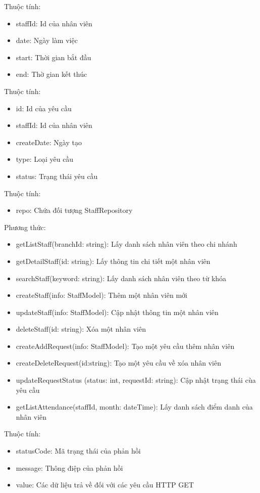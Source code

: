 Thuộc tính:
\begin{itemize}
	\item staffId: Id của nhân viên
	\item date: Ngày làm việc
	\item start: Thời gian bắt đầu
	\item end: Thờ gian kết thúc
\end{itemize}

Thuộc tính:
\begin{itemize}
	\item id: Id của yêu cầu
	\item staffId: Id của nhân viên
	\item createDate: Ngày tạo
	\item type: Loại yêu cầu
	\item status: Trạng thái yêu cầu
\end{itemize}

Thuộc tính:
\begin{itemize}
	\item repo: Chứa đối tượng StaffRepository
\end{itemize}
Phương thức:
\begin{itemize}
	\item getListStaff(branchId: string): Lấy danh sách nhân viên theo chi nhánh
	\item getDetailStaff(id: string): Lấy thông tin chi tiết một nhân viên
	\item searchStaff(keyword: string): Lấy danh sách nhân viên theo từ khóa
	\item createStaff(info: StaffModel): Thêm một nhân viên mới
	\item updateStaff(info: StaffModel): Cập nhật thông tin một nhân viên
	\item deleteStaff(id: string): Xóa một nhân viên
	\item createAddRequest(info: StaffModel): Tạo một yêu cầu thêm nhân viên
	\item createDeleteRequest(id:string): Tạo một yêu cầu về xóa nhân viên
	\item updateRequestStatus (status: int, requestId: string): Cập nhật trạng thái cùa yêu cầu
	\item getListAttendance(staffId, month: dateTime): Lấy danh sách điểm danh của nhân viên
\end{itemize}

Thuộc tính:
\begin{itemize}
	\item statusCode: Mã trạng thái của phản hồi
	\item message: Thông điệp của phản hồi
	\item value: Các dữ liệu trả về đối với các yêu cầu HTTP GET
\end{itemize}



